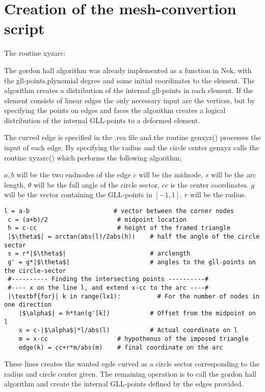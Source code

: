 \section{Creation of the mesh-convertion script}
The routine xyzarc:

The gordon hall algorithm was already implemented as a function in Nek, with the gll-points,plynomial degree and some initial 
coordinates to the element. The algorithm creates a distribution of the internal gll-points in each element. 
If the element consists of linear edges the only necessary input are the vertices, but by specifying the points on edges and faces
the algorithm creates a logical distribution of the internal GLL-points to a deformed element. 

The curved edge is specified in the .rea file and the routine genxyz() processes the input of each edge. 
By specifying the radius and the circle center genxyz calls the routine xyzarc() which performs the following algorithm;

    $a,b$ will be the two endnodes of the edge 
    $c$ will be the midnode, $s$ will be the arc length, $\theta$ will be the full angle of the circle sector, $cc$ is the center coordinates.
    $g$ will be the vector containing the GLL-points in $[-1,1]$. $r$ will be the radius.

\begingroup
\fontsize{12pt}{14pt}
\begin{lstlisting}[escapechar=|]
 l = a-b                       # vector between the corner nodes
 c = (a+b)/2                   # midpoint location
 h = c-cc                      # height of the framed triangle
 |$\theta$| = arctan(abs(l)/2abs(h))    # half the angle of the circle sector
 s = r*|$\theta$|                       # arclength
 g' = g*|$\theta$|                      # angles to the gll-points on the circle-sector
 #---------- Finding the intersecting points ----------#
 #---- x on the line l, and extend x-cc to the arc ----#
 |\textbf{for}| k in range(lx1):          # For the number of nodes in one direction
    |$\alpha$| = h*tan(g'[k])           # Offset from the midpoint on l
    x = c-|$\alpha$|*l/abs(l)           # Actual coordinate on l
    m = x-cc                   # hypothenus of the imposed triangle
    edge(k) = cc+r*m/abs(m)    # final coordinate on the arc
\end{lstlisting}
\endgroup
These lines creates the wanted egde curved as a circle sector corresponding to the radius and circle center given.
The remaining operation is to call the gordon hall algorithm and create the internal GLL-points defined by the edges 
provided.



